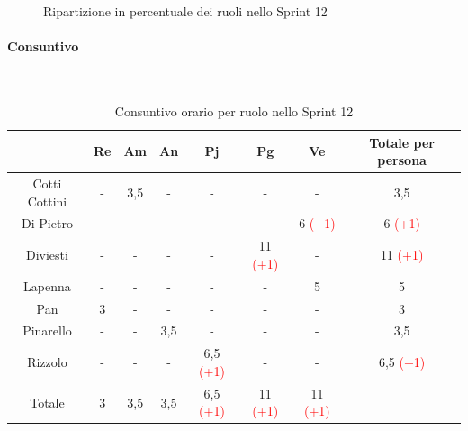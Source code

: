 \documentclass{article}
\begin{document}
                \begin{figure}[H]
                    \centering
                    \caption{Ripartizione in percentuale dei ruoli nello Sprint 12}
                \end{figure}


                \paragraph{Consuntivo}\mbox{}\\
                \begin{table}[H]
                    \centering
                    \begin{tabular}{|c|c|c|c|c|c|c|c|}
                    \hline
                                  & Re  & Am  & An  & Pj  & Pg  & Ve  & Totale per persona \\ \hline
                    Cotti Cottini & -   & 3,5 & -   & -   & -   & -   & 3,5                \\ \hline
                    Di Pietro     & -   & -   & -   & -   & -   & 6 \textcolor{red}{(+1)}   & 6 \textcolor{red}{(+1)}                  \\ \hline
                    Diviesti      & -   & -   & -   & -   & 11 \textcolor{red}{(+1)}  & -   & 11 \textcolor{red}{(+1)}                 \\ \hline
                    Lapenna       & -   & -   & -   & -   & -   & 5   & 5                  \\ \hline
                    Pan           & 3   & -   & -   & -   & -   & -   & 3                  \\ \hline
                    Pinarello     & -   & -   & 3,5 & -   & -   & -   & 3,5                \\ \hline
                    Rizzolo       & -   & -   & -   & 6,5 \textcolor{red}{(+1)} & -   & -   & 6,5 \textcolor{red}{(+1)}               \\ \hline
                    Totale        & 3   & 3,5 & 3,5 & 6,5 \textcolor{red}{(+1)} & 11 \textcolor{red}{(+1)}  & 11 \textcolor{red}{(+1)}  &                    \\ \hline
                    \end{tabular}
                    \caption{Consuntivo orario per ruolo nello Sprint 12}
                \end{table}
\end{document}
